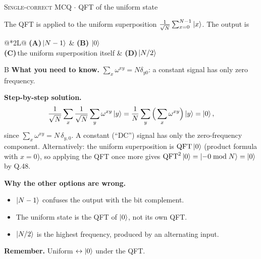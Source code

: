 \documentclass[11pt,a4paper]{article}
\newcommand{\optlabel}[1]{\textbf{(#1)}}
\newcommand{\correctlabel}[1]{\textcolor{okgreen}{\textbf{(#1)}\,\ding{51}}}
\newenvironment{qitem}[1]{\begin{list}{}{\setlength{\leftmargin}{3.3em}\setlength{\labelwidth}{3.1em}%
  \setlength{\labelsep}{0.2em}\setlength{\topsep}{3pt}\setlength{\parsep}{3pt}}\item[\textbf{Q.#1}\hfill]}{\end{list}}
\newcommand{\qsep}{\par\vspace{2pt}{\color{black!15}\hrule}\vspace{4pt}}
\newcommand{\qmeta}[2]{{\footnotesize\color{black!60}\textsc{#1} \;$\cdot$\; #2}\par}
\begin{document}
\begin{qitem}{49}
\qmeta{Single-correct MCQ}{QFT of the uniform state}
The QFT is applied to the uniform superposition $\frac{1}{\sqrt N}\sum_{x=0}^{N-1}\ket{x}$. The output is
\par\smallskip\noindent\begin{tabularx}{\linewidth}{@{}*{2}{L}@{}}
\optlabel{A}\,$\ket{N-1}$ & \correctlabel{B}\,$\ket{0}$ \\[3pt]
\optlabel{C}\,the uniform superposition itself & \optlabel{D}\,$\ket{N/2}$
\end{tabularx}
\end{qitem}
\begin{solbox}{B}
\textbf{\color{brand}What you need to know.} $\sum_x\omega^{xy} = N\delta_{y0}$: a constant signal has only zero frequency.

\textbf{\color{brand}Step-by-step solution.} \[ \frac{1}{\sqrt N}\sum_x \frac{1}{\sqrt N}\sum_y\omega^{xy}\ket y = \frac1N\sum_y\Big(\sum_x\omega^{xy}\Big)\ket y = \ket0, \]
since $\sum_x \omega^{xy} = N\,\delta_{y,0}$. A constant (``DC'') signal has only the zero-frequency component.
Alternatively: the uniform superposition is $\mathrm{QFT}\ket0$ (product formula with $x = 0$), so applying the QFT once more gives
$\mathrm{QFT}^2\ket0 = \ket{-0 \bmod N} = \ket0$ by Q.48.

\textbf{\color{brand}Why the other options are wrong.}
\begin{itemize}[leftmargin=2.4em, itemsep=1pt, topsep=2pt]
\item[\textbf{(A)}] $\ket{N-1}$ confuses the output with the bit complement.
\item[\textbf{(C)}] The uniform state is the QFT of $\ket0$, not its own QFT.
\item[\textbf{(D)}] $\ket{N/2}$ is the highest frequency, produced by an alternating input.
\end{itemize}
\textbf{\color{brand}Remember.} Uniform $\leftrightarrow\ket0$ under the QFT.
\end{solbox}
\qsep
\end{document}
